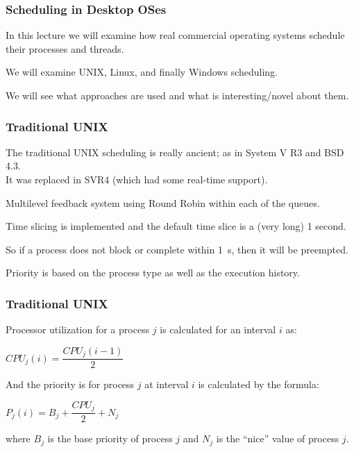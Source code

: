 \begin{frame}
\partpage
\end{frame}

\begin{frame}
\frametitle{Scheduling in Desktop OSes}

In this lecture we will examine how real commercial operating systems schedule their processes and threads. 

We will examine UNIX, Linux, and finally Windows scheduling. 

We will see what approaches are used and what is interesting/novel about them.


\end{frame}

\begin{frame}
\frametitle{Traditional UNIX}

The traditional UNIX scheduling is really ancient; as in System V R3 and BSD 4.3.\\
\quad It was replaced in SVR4 (which had some real-time support).

Multilevel feedback system using Round Robin within each of the queues. 

Time slicing is implemented and the default time slice is a (very long) 1 second. 

So if a process does not block or complete within 1~s, then it will be preempted. 

Priority is based on the process type as well as the execution history.

\end{frame}

\begin{frame}
\frametitle{Traditional UNIX}

Processor utilization for a process $j$ is calculated for an interval $i$ as:

\begin{center}
$CPU_{j}(i) = \dfrac{CPU_{j}(i - 1)}{2}$
\end{center}

And the priority is for process $j$ at interval $i$ is calculated by the formula:

\begin{center}
$P_{j}(i) = B_{j} + \dfrac{CPU_{j}}{2} + N_{j}$
\end{center}

where $B_{j}$ is the base priority of process $j$ and $N_{j}$ is the ``nice'' value of process $j$.


\end{frame}

